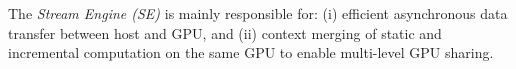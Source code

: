 %


The \textit{Stream Engine (SE)} is mainly responsible for: (i) efficient asynchronous data transfer between host and GPU, and (ii) context merging of static and incremental computation on the same GPU to enable multi-level GPU sharing. 

